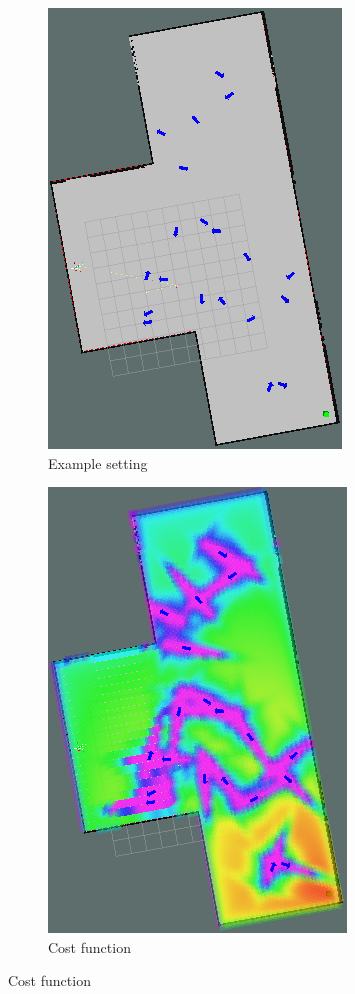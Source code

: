 \documentclass{article}  %
\begin{document}
	\begin{figure}[tbh]
	\centering
      \begin{subfigure}[b]{0.42\columnwidth}
    \includegraphics[scale = 0.3]{images/people.png}
    \caption{Example setting }
    \label{fig:exp_setting}
  \end{subfigure}
  \hspace{10mm}
  \begin{subfigure}[b]{0.42\columnwidth}
  \hspace{4mm}
    \includegraphics[scale = 0.3]{images/cost_f.png}
    \caption{Cost function}
    \label{fig:cost_f}
  \end{subfigure} 


\end{figure}
\end{document}
